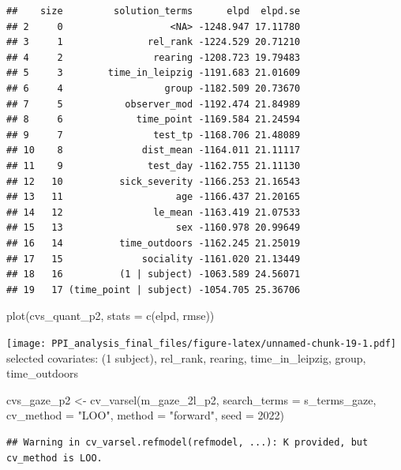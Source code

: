 \documentclass[
]{article}
\newenvironment{Shaded}{\begin{snugshade}}{\end{snugshade}}
\newcommand{\AttributeTok}[1]{\textcolor[rgb]{0.77,0.63,0.00}{#1}}
\newcommand{\DecValTok}[1]{\textcolor[rgb]{0.00,0.00,0.81}{#1}}
\newcommand{\FunctionTok}[1]{\textcolor[rgb]{0.00,0.00,0.00}{#1}}
\newcommand{\NormalTok}[1]{#1}
\newcommand{\OtherTok}[1]{\textcolor[rgb]{0.56,0.35,0.01}{#1}}
\newcommand{\StringTok}[1]{\textcolor[rgb]{0.31,0.60,0.02}{#1}}
\begin{document}
\begin{verbatim}
##    size         solution_terms      elpd  elpd.se
## 2     0                   <NA> -1248.947 17.11780
## 3     1               rel_rank -1224.529 20.71210
## 4     2                rearing -1208.723 19.79483
## 5     3        time_in_leipzig -1191.683 21.01609
## 6     4                  group -1182.509 20.73670
## 7     5           observer_mod -1192.474 21.84989
## 8     6             time_point -1169.584 21.24594
## 9     7                test_tp -1168.706 21.48089
## 10    8              dist_mean -1164.011 21.11117
## 11    9               test_day -1162.755 21.11130
## 12   10          sick_severity -1166.253 21.16543
## 13   11                    age -1166.437 21.20165
## 14   12                le_mean -1163.419 21.07533
## 15   13                    sex -1160.978 20.99649
## 16   14          time_outdoors -1162.245 21.25019
## 17   15              sociality -1161.020 21.13449
## 18   16          (1 | subject) -1063.589 24.56071
## 19   17 (time_point | subject) -1054.705 25.36706
\end{verbatim}

\begin{Shaded}
\begin{Highlighting}[]
\FunctionTok{plot}\NormalTok{(cvs\_quant\_p2, }\AttributeTok{stats =} \FunctionTok{c}\NormalTok{(}\StringTok{\textquotesingle{}elpd\textquotesingle{}}\NormalTok{, }\StringTok{\textquotesingle{}rmse\textquotesingle{}}\NormalTok{))}
\end{Highlighting}
\end{Shaded}

\texttt{[image: PPI\_analysis\_final\_files/figure-latex/unnamed-chunk-19-1.pdf]}
selected covariates: (1 \textbar{} subject), rel\_rank, rearing, time\_in\_leipzig, group, time\_outdoors

\begin{Shaded}
\begin{Highlighting}[]
\NormalTok{cvs\_gaze\_p2 }\OtherTok{\textless{}{-}} \FunctionTok{cv\_varsel}\NormalTok{(m\_gaze\_2l\_p2, }
                         \AttributeTok{search\_terms =}\NormalTok{ s\_terms\_gaze, }
                         \AttributeTok{cv\_method =} \StringTok{"LOO"}\NormalTok{, }\AttributeTok{method =} \StringTok{"forward"}\NormalTok{, }
                         \AttributeTok{seed =} \DecValTok{2022}\NormalTok{)}
\end{Highlighting}
\end{Shaded}

\begin{verbatim}
## Warning in cv_varsel.refmodel(refmodel, ...): K provided, but cv_method is LOO.
\end{verbatim}
\end{document}
